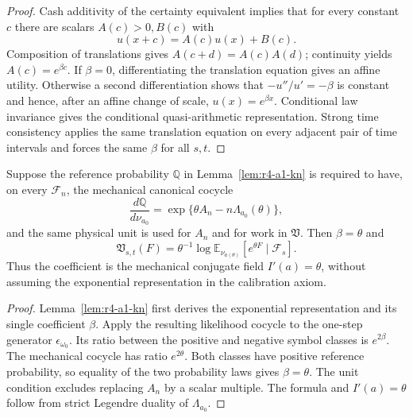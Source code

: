 \begin{proof}
Cash additivity of the certainty equivalent implies that for every constant
\(c\) there are scalars \(A(c)>0,B(c)\) with
\[
 u(x+c)=A(c)u(x)+B(c).
\]
Composition of translations gives
\(A(c+d)=A(c)A(d)\); continuity yields \(A(c)=e^{\beta c}\).  If
\(\beta=0\), differentiating the translation equation gives an affine
utility.  Otherwise a second differentiation shows that
\(-u''/u'= -\beta\) is constant and hence, after an affine change of scale,
\(u(x)=e^{\beta x}\).  Conditional law invariance gives the conditional
quasi-arithmetic representation.  Strong time consistency applies the same
translation equation on every adjacent pair of time intervals and forces the
same \(\beta\) for all \(s,t\).
\end{proof}

\begin{theorem}
\label{thm:r4-a1-calibration}
Suppose the reference probability \(\mathbb Q\) in
Lemma~\ref{lem:r4-a1-kn} is required to have, on every \(\mathcal F_n\), the
mechanical canonical cocycle
\[
 \frac{d\mathbb Q}{d\nu_{a_0}}
 =\exp\{\theta A_n-n\Lambda_{a_0}(\theta)\},
\]
and the same physical unit is used for \(A_n\) and for work in
\(\mathfrak V\).  Then \(\beta=\theta\) and
\[
 \mathfrak V_{s,t}(F)
 =\theta^{-1}
 \log\mathbb E_{\nu_{a(\theta)}}
 [e^{\theta F}\mid\mathcal F_s].
\]
Thus the coefficient is the mechanical conjugate field
\(I'(a)=\theta\), without assuming the exponential representation in the
calibration axiom.
\end{theorem}

\begin{proof}
Lemma~\ref{lem:r4-a1-kn} first derives the exponential representation and its
single coefficient \(\beta\).  Apply the resulting likelihood cocycle to the
one-step generator \(\epsilon_{\omega_0}\).  Its ratio between the positive
and negative symbol classes is \(e^{2\beta}\).  The mechanical cocycle has
ratio \(e^{2\theta}\).  Both classes have positive reference probability, so
equality of the two probability laws gives \(\beta=\theta\).  The unit
condition excludes replacing \(A_n\) by a scalar multiple.  The formula and
\(I'(a)=\theta\) follow from strict Legendre duality of
\(\Lambda_{a_0}\).
\end{proof}
